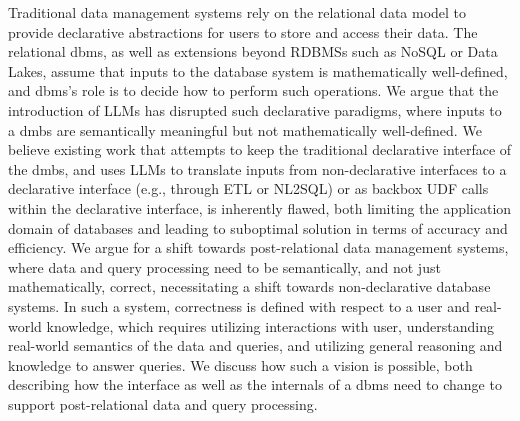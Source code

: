 Traditional data management systems rely on the relational data model to provide declarative abstractions for users to store and access their data. The relational dbms, as well as extensions beyond RDBMSs such as NoSQL or Data Lakes, %
assume that inputs to the database system is mathematically well-defined, and dbms's role is to decide how to perform such operations. We argue that the introduction of LLMs has disrupted such declarative paradigms, where inputs to a dmbs are semantically meaningful but not mathematically well-defined. We believe existing work that attempts to keep the traditional declarative interface of the dmbs, and uses LLMs to translate inputs from non-declarative interfaces to a declarative interface (e.g., through ETL or NL2SQL) or as backbox UDF calls within the declarative interface, is inherently flawed, both limiting the application domain of databases and leading to suboptimal solution in terms of accuracy and efficiency. We argue for a shift towards post-relational data management systems, where data and query processing need to be semantically, and not just mathematically, correct, necessitating a shift towards non-declarative database systems. In such a system, correctness is defined with respect to a user and real-world knowledge, which requires utilizing interactions with user, understanding real-world semantics of the data and queries, and utilizing general reasoning and knowledge to answer queries. We discuss how such a vision is possible, both describing how the interface as well as the internals of a dbms need to change to support post-relational data and query processing. %

